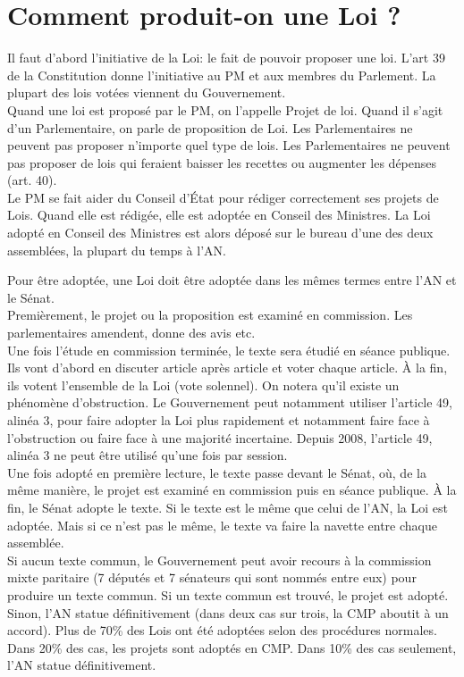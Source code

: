 \documentclass[12pt, a4paper, openany]{book}
\begin{document}
\section{Comment produit-on une Loi ?}

Il faut d'abord l'initiative de la Loi: le fait de pouvoir proposer une loi. L'art 39 de la Constitution donne l'initiative au PM et aux membres du Parlement. La plupart des lois votées viennent du Gouvernement. \\
Quand une loi est proposé par le PM, on l'appelle Projet de loi. Quand il s'agit d'un Parlementaire, on parle de proposition de Loi. Les Parlementaires ne peuvent pas proposer n'importe quel type de lois. Les Parlementaires ne peuvent pas proposer de lois qui feraient baisser les recettes ou augmenter les dépenses (art. 40). \\
Le PM se fait aider du Conseil d'État pour rédiger correctement ses projets de Lois. Quand elle est rédigée, elle est adoptée en Conseil des Ministres. La Loi adopté en Conseil des Ministres est alors déposé sur le bureau d'une des deux assemblées, la plupart du temps à l'AN.


Pour être adoptée, une Loi doit être adoptée dans les mêmes termes entre l'AN et le Sénat. \\
Premièrement, le projet ou la proposition est examiné en commission. Les parlementaires amendent, donne des avis etc. \\
Une fois l'étude en commission terminée, le texte sera étudié en séance publique. Ils vont d'abord en discuter article après article et voter chaque article. À la fin, ils votent l'ensemble de la Loi (vote solennel). On notera qu'il existe un phénomène d'obstruction. Le Gouvernement peut notamment utiliser l'article 49, alinéa 3, pour faire adopter la Loi plus rapidement et notamment faire face à l'obstruction ou faire face à une majorité  incertaine. Depuis 2008, l'article 49, alinéa 3 ne peut être utilisé qu'une fois par session. \\
Une fois adopté en première lecture, le texte passe devant le Sénat, où, de la même manière, le projet est examiné en commission puis en séance publique. À la fin, le Sénat adopte le texte. Si le texte est le même que celui de l'AN, la Loi est adoptée. Mais si ce n'est pas le même, le texte va faire la navette entre chaque assemblée. \\
Si aucun texte commun, le Gouvernement peut avoir recours à la commission mixte paritaire (7 députés et 7 sénateurs qui sont nommés entre eux) pour produire un texte commun. Si un texte commun est trouvé, le projet est adopté. Sinon, l'AN statue définitivement (dans deux cas sur trois, la CMP aboutit à un accord). Plus de 70\% des Lois ont été adoptées selon des procédures normales. Dans 20\% des cas, les projets sont adoptés en CMP. Dans 10\% des cas seulement, l'AN statue définitivement. 
\end{document}
